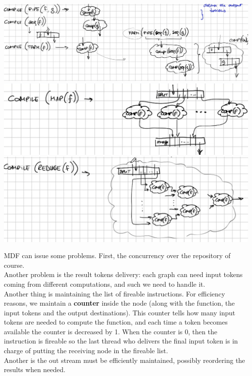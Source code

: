 \documentclass[10pt]{report}
\begin{document}
\begin{center}
	\includegraphics[scale=0.4]{31.png}\\
	\includegraphics[scale=0.5]{32.png}\\
	\includegraphics[scale=0.5]{33.png}
\end{center}
MDF can issue some problems. First, the concurrency over the repository of course.\\
Another problem is the result tokens delivery: each graph can need input tokens coming from different computations, and such we need to handle it.\\
Another thing is maintaining the list of fireable instructions. For efficiency reasons, we maintain a \textbf{counter} inside the node (along with the function, the input tokens and the output destinations). This counter tells how many input tokens are needed to compute the function, and each time a token becomes available the counter is decreased by 1. When the counter is 0, then the instruction is fireable so the last thread who delivers the final input token is in charge of putting the receiving node in the fireable list.\\
Another is the out stream must be efficiently maintained, possibly reordering the results when needed.\\
\end{document}
